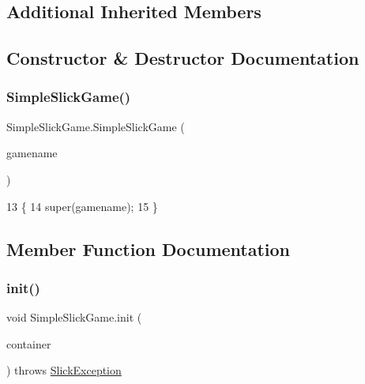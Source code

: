 \subsection*{Additional Inherited Members}


\subsection{Constructor \& Destructor Documentation}
\mbox{\label{class_simple_slick_game_a4e58074dc344280962a5db792e242612}} 
\subsubsection{\texorpdfstring{Simple\+Slick\+Game()}{SimpleSlickGame()}}
{\footnotesize\ttfamily Simple\+Slick\+Game.\+Simple\+Slick\+Game (\begin{DoxyParamCaption}\item[{String}]{gamename }\end{DoxyParamCaption})\hspace{0.3cm}{\ttfamily [inline]}}


\begin{DoxyCode}
13     \{
14         super(gamename);
15     \}
\end{DoxyCode}


\subsection{Member Function Documentation}
\mbox{\label{class_simple_slick_game_a2380b54e7768fd10b9959866dffc57ce}} 
\subsubsection{\texorpdfstring{init()}{init()}}
{\footnotesize\ttfamily void Simple\+Slick\+Game.\+init (\begin{DoxyParamCaption}\item[{\mbox{\hyperlink{classorg_1_1newdawn_1_1slick_1_1_game_container}{Game\+Container}}}]{container }\end{DoxyParamCaption}) throws \mbox{\hyperlink{classorg_1_1newdawn_1_1slick_1_1_slick_exception}{Slick\+Exception}}\hspace{0.3cm}{\ttfamily [inline]}}

